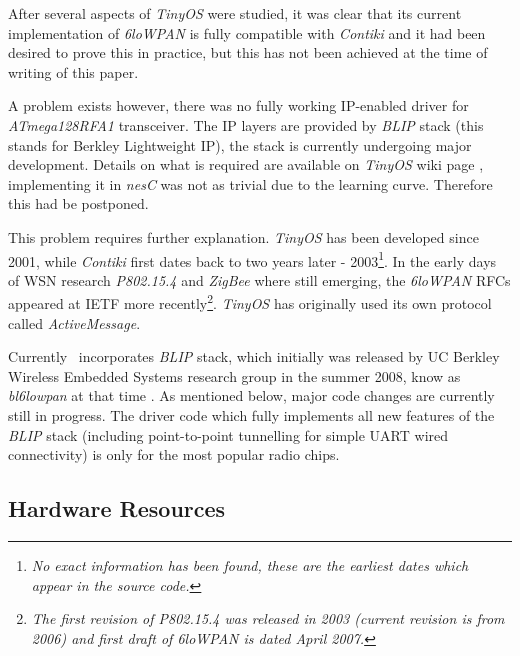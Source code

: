   After several aspects of \emph{TinyOS} were studied, it was clear
 that its current implementation of \emph{6loWPAN} is fully compatible
 with \emph{Contiki} and it had been desired to prove this in practice,
 but this has not been achieved at the time of writing of this paper.
  
  A problem exists however, there was no fully working IP-enabled driver
 for \emph{ATmega128RFA1} transceiver. The IP layers are provided by
 \emph{BLIP} stack (this stands for Berkley Lightweight IP), the stack
 is currently undergoing major development. Details on what is required
 are available on \emph{TinyOS} wiki page \cite{tinyos:wiki:blip20},
 implementing it in \emph{nesC} was not as trivial due to the learning
 curve. Therefore this had be postponed.

  This problem requires further explanation. \emph{TinyOS} has been
 developed since 2001, while \emph{Contiki} first dates back to two
 years later - 2003\footnote{\emph{No exact information has been
 found, these are the earliest dates which appear in the source code.}}. 
 In the early days of WSN research \emph{P802.15.4} and \emph{ZigBee}
 where still emerging, the \emph{6loWPAN} RFCs appeared at IETF more
 recently\footnote{\emph{The first revision of P802.15.4 was released
 in 2003 (current revision is from 2006) and first draft of 6loWPAN
 is dated April 2007.}}. \emph{TinyOS} has originally used its own
 protocol called \emph{ActiveMessage}.

  Currently \TinyOS\ incorporates \emph{BLIP} stack, which initially
 was released by UC Berkley Wireless Embedded Systems research group
 in the summer 2008, know as \emph{bl6lowpan} at that time \cite{ucb:webs:blip}.
 As mentioned below, major code changes are currently still in progress.
 The driver code which fully implements all new features of the \emph{BLIP}
 stack (including point-to-point tunnelling for simple UART wired
 connectivity) is only for the most popular  radio chips.

\subsection{Hardware Resources}

